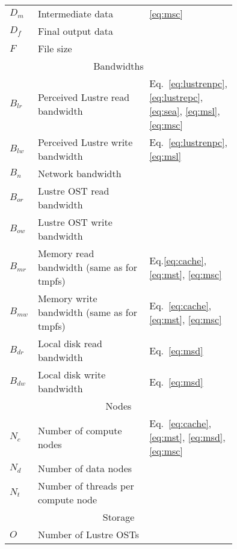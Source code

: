 \documentclass[10pt,journal,compsoc]{IEEEtran}
\begin{document}
\begin{table}
\begin{tabular}{|p{0.05\linewidth}|p{0.6\linewidth}|p{0.1\linewidth}|}
       $D_{m}$ & Intermediate data & \ref{eq:msc} \\
       $D_{f}$ & Final output data & \\
       $F$ & File size & \\
       \hline
              \multicolumn{3}{|c|}{Bandwidths} \\                                         
       \hline                                                                      
       $B_{lr}$ & Perceived Lustre read bandwidth & Eq.~\ref{eq:lustrenpc}, \ref{eq:lustrepc}, \ref{eq:sea}, \ref{eq:msl}, \ref{eq:msc}\\
       $B_{lw}$ & Perceived Lustre write bandwidth & Eq.~\ref{eq:lustrenpc}, \ref{eq:msl}\\
       $B_{n}$ & Network bandwidth & \\              
       $B_{or}$ & Lustre OST read bandwidth & \\     
       $B_{ow}$ & Lustre OST write bandwidth & \\    
       $B_{mr}$ & Memory read bandwidth (same as for tmpfs) & Eq.\ref{eq:cache}, \ref{eq:mst}, \ref{eq:msc}\\
       $B_{mw}$ & Memory write bandwidth (same as for tmpfs) & Eq.~\ref{eq:cache}, \ref{eq:mst}, \ref{eq:msc}\\
       $B_{dr}$ & Local disk read bandwidth & Eq.~\ref{eq:msd}\\                   
       $B_{dw}$ & Local disk write bandwidth & Eq.~\ref{eq:msd}\\                  
       \hline                                                                      
       \multicolumn{3}{|c|}{Nodes} \\                                              
       \hline                                                                      
       $N_{c}$ & Number of compute nodes & Eq.~\ref{eq:cache}, \ref{eq:mst}, \ref{eq:msd}, \ref{eq:msc}\\
       $N_{d}$ & Number of data nodes & \\           
       $N_{t}$ & Number of threads per compute node & \\
       \hline                                                                      
       \multicolumn{3}{|c|}{Storage} \\                                            
       \hline                                                                      
       $O$ & Number of Lustre OSTs & \\              

\end{tabular}
\end{table}
\end{document}
